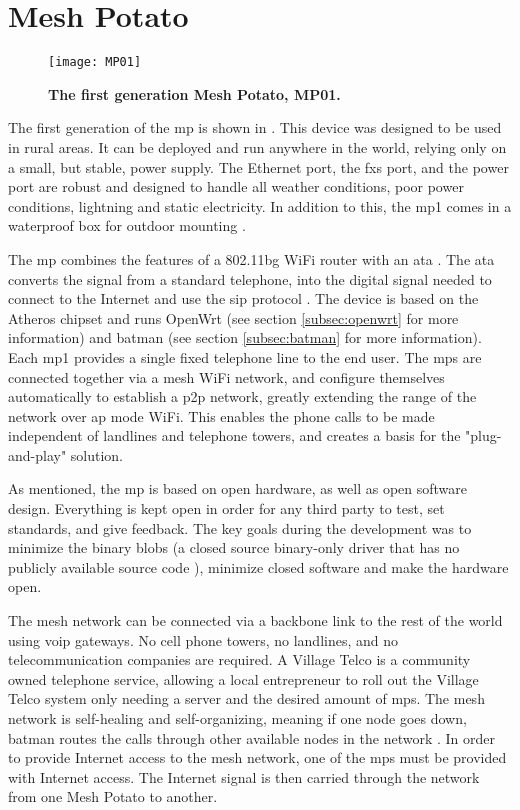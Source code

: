 \section{Mesh Potato}

\begin{figure}[b]
  \centering
      \texttt{[image: MP01]}
  \caption [MP01]{\textbf{The first generation Mesh Potato, MP01.}}
  \label{fig:MP01}
\end{figure}

The first generation of the \gls{mp} is shown in . This device was designed to be used in rural areas. It can be deployed and run anywhere in the world, relying only on a small, but stable, power supply. The Ethernet port, the \gls{fxs} port, and the power port are robust and designed to handle all weather conditions, poor power conditions, lightning and static electricity. In addition to this, the \gls{mp1} comes in a waterproof box for outdoor mounting \cite{background}.

The \gls{mp} combines the features of a 802.11bg WiFi router with an \gls{ata} \cite{MP}. The \gls{ata} converts the signal from a standard telephone, into the digital signal needed to connect to the Internet and use the \gls{sip} protocol \cite{MParticle}. The device is based on the Atheros chipset and runs OpenWrt (see section \ref{subsec:openwrt} for more information) and \gls{batman} (see section \ref{subsec:batman} for more information). Each \gls{mp1} provides a single fixed telephone line to the end user. The \glspl{mp} are connected together via a mesh WiFi network, and configure themselves automatically to establish a \gls{p2p} network, greatly extending the range of the network over \gls{ap} mode WiFi. This enables the phone calls to be made independent of landlines and telephone towers, and creates a basis for the "plug-and-play" solution. 

As mentioned, the \gls{mp} is based on open hardware, as well as open software design. Everything is kept open in order for any third party to test, set standards, and give feedback. The key goals during the development was to minimize the binary blobs (a closed source binary-only driver that has no publicly available source code \cite{binaryBolb}), minimize closed software and make the hardware open. 

The mesh network can be connected via a backbone link to the rest of the world using \gls{voip} gateways. No cell phone towers, no landlines, and no telecommunication companies are required. A Village Telco is a community owned telephone service, allowing a local entrepreneur to roll out the Village Telco system only needing a server and the desired amount of \glspl{mp}. The mesh network is self-healing and self-organizing, meaning if one node goes down, \gls{batman} routes the calls through other available nodes in the network \cite{MPbyRowe}. In order to provide Internet access to the mesh network, one of the \glspl{mp} must be provided with Internet access. The Internet signal is then carried through the network from one Mesh Potato to another. 


